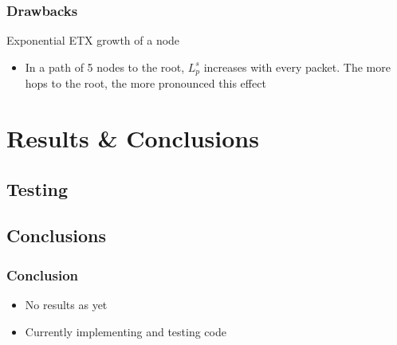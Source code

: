 \documentclass{beamer}
\begin{document}
\begin{frame}
  \frametitle{Drawbacks}
    Exponential ETX growth of a node
  \begin{itemize}
    \item In a path of 5 nodes to the root, $L_p^s$ increases with every packet.
    The more hops to the root, the more pronounced this effect
  \end{itemize}
\end{frame}  


\section{Results \& Conclusions}
\subsection{Testing}

\subsection{Conclusions}

\begin{frame}
  \frametitle{Conclusion}
  \begin{itemize}
    \item No results as yet
    \item Currently implementing and testing code
  \end{itemize}
\end{frame}  
\end{document}
